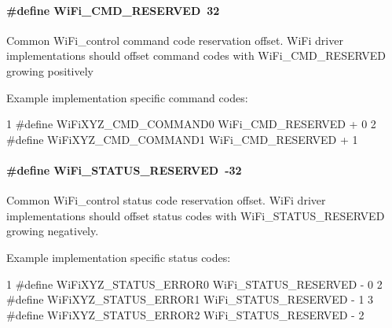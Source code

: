 \paragraph[{Wi\+Fi\+\_\+\+C\+M\+D\+\_\+\+R\+E\+S\+E\+R\+V\+E\+D}]{\setlength{\rightskip}{0pt plus 5cm}\#define Wi\+Fi\+\_\+\+C\+M\+D\+\_\+\+R\+E\+S\+E\+R\+V\+E\+D~32}\label{group___wi_fi___c_o_n_t_r_o_l_ga1f193fb2e462cfbfe8d5648c7b766710}
Common Wi\+Fi\+\_\+control command code reservation offset. Wi\+Fi driver implementations should offset command codes with Wi\+Fi\+\_\+\+C\+M\+D\+\_\+\+R\+E\+S\+E\+R\+V\+E\+D growing positively

Example implementation specific command codes\+: 
\begin{DoxyCode}
1 #define WiFiXYZ\_CMD\_COMMAND0     WiFi\_CMD\_RESERVED + 0
2 #define WiFiXYZ\_CMD\_COMMAND1     WiFi\_CMD\_RESERVED + 1
\end{DoxyCode}
\paragraph[{Wi\+Fi\+\_\+\+S\+T\+A\+T\+U\+S\+\_\+\+R\+E\+S\+E\+R\+V\+E\+D}]{\setlength{\rightskip}{0pt plus 5cm}\#define Wi\+Fi\+\_\+\+S\+T\+A\+T\+U\+S\+\_\+\+R\+E\+S\+E\+R\+V\+E\+D~-\/32}\label{group___wi_fi___c_o_n_t_r_o_l_ga2c7d9d0bec5da43eb7cc442f2f155399}
Common Wi\+Fi\+\_\+control status code reservation offset. Wi\+Fi driver implementations should offset status codes with Wi\+Fi\+\_\+\+S\+T\+A\+T\+U\+S\+\_\+\+R\+E\+S\+E\+R\+V\+E\+D growing negatively.

Example implementation specific status codes\+: 
\begin{DoxyCode}
1 #define WiFiXYZ\_STATUS\_ERROR0    WiFi\_STATUS\_RESERVED - 0
2 #define WiFiXYZ\_STATUS\_ERROR1    WiFi\_STATUS\_RESERVED - 1
3 #define WiFiXYZ\_STATUS\_ERROR2    WiFi\_STATUS\_RESERVED - 2
\end{DoxyCode}
 